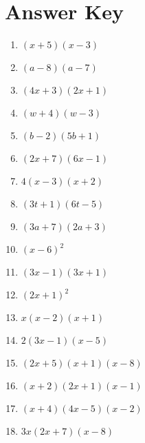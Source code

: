 \newpage

\section{Answer Key}

\begin{enumerate}
	\item $(x+5)(x-3)$
    \item $(a-8)(a-7)$
    \item $(4x+3)(2x+1)$
    \item $(w+4)(w-3)$
	\item $(b-2)(5b+1)$
    \item $(2x+7)(6x-1)$
    \item $4(x-3)(x+2)$
    \item $(3t+1)(6t-5)$
    \item $(3a+7)(2a+3)$
    \item $(x-6)^2$
    \item $(3x-1)(3x+1)$
    \item $(2x+1)^2$
    \item $x(x-2)(x+1)$
    \item $2(3x-1)(x-5)$
    \item $(2x+5)(x+1)(x-8)$
    \item $(x+2)(2x+1)(x-1)$
    \item $(x+4)(4x-5)(x-2)$
    \item $3x(2x+7)(x-8)$
\end{enumerate}